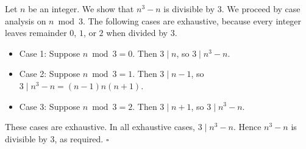 Let $n$ be an integer.
We show that $n^{3} - n$ is divisible by $3$.
We proceed by case analysis on $n \bmod 3$.
The following cases are exhaustive, because every integer leaves remainder $0$, $1$, or $2$ when divided by $3$.

\begin{itemize}
  \item Case 1: Suppose $n \bmod 3 = 0$.
    Then $3 \mid n$, so $3 \mid n^{3} - n$.
  \item Case 2: Suppose $n \bmod 3 = 1$.
    Then $3 \mid n - 1$, so $3 \mid n^{3} - n = (n - 1)n(n + 1)$.
  \item Case 3: Suppose $n \bmod 3 = 2$.
    Then $3 \mid n + 1$, so $3 \mid n^{3} - n$.
\end{itemize}

These cases are exhaustive.
In all exhaustive cases, $3 \mid n^{3} - n$.
Hence $n^{3} - n$ is divisible by $3$, as required. \hfill$\square$